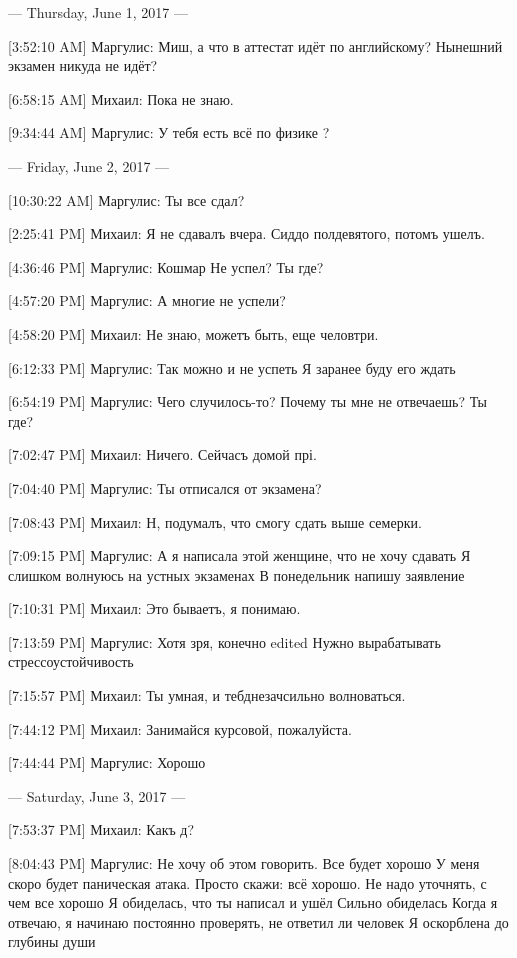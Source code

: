 \documentclass{article}
\newcommand{\yat}{{\fontencoding{X2}\selectfont\cyryat}} %
\begin{document}
\title{}
\author{}
\date{}
\maketitle

--- Thursday, June 1, 2017 ---

[3:52:10 AM] Маргулис:
Миш, а что в аттестат идёт по английскому?
 Нынешний экзамен никуда не идёт?

[6:58:15 AM] Михаил:
Пока не знаю.

[9:34:44 AM] Маргулис:
У тебя есть всё по физике
 ?

--- Friday, June 2, 2017 ---

[10:30:22 AM] Маргулис:
Ты все сдал?

[2:25:41 PM] Михаил:
Я не сдавалъ вчера. Сид до полдевятого, потомъ ушелъ.

[4:36:46 PM] Маргулис:
Кошмар
 Не успел?
 Ты где?

[4:57:20 PM] Маргулис:
А многие не успели?

[4:58:20 PM] Михаил:
Не знаю, можетъ быть, еще челов три.

[6:12:33 PM] Маргулис:
Так можно и не успеть
 Я заранее буду его ждать

[6:54:19 PM] Маргулис:
Чего случилось-то? Почему ты мне не отвечаешь?
 Ты где?

[7:02:47 PM] Михаил:
Ничего. Сейчасъ домой прі.

[7:04:40 PM] Маргулис:
Ты отписался от экзамена?

[7:08:43 PM] Михаил:
Н, подумалъ, что смогу сдать выше семерки.

[7:09:15 PM] Маргулис:
А я написала этой женщине, что не хочу сдавать
 Я слишком волнуюсь на устных экзаменах
 В понедельник напишу заявление

[7:10:31 PM] Михаил:
Это бываетъ, я понимаю.

[7:13:59 PM] Маргулис:
Хотя зря, конечно
edited 
Нужно вырабатывать стрессоустойчивость

[7:15:57 PM] Михаил:
Ты умная, и теб\yat д незач сильно волноваться.

[7:44:12 PM] Михаил:
Занимайся курсовой, пожалуйста.

[7:44:44 PM] Маргулис:
Хорошо

--- Saturday, June 3, 2017 ---

[7:53:37 PM] Михаил:
Какъ д?

[8:04:43 PM] Маргулис:
Не хочу об этом говорить.
 Все будет хорошо
 У меня скоро будет паническая атака. Просто скажи: всё хорошо. Не надо уточнять, с чем все хорошо
 Я обиделась, что ты написал и ушёл
 Сильно обиделась
 Когда я отвечаю, я начинаю постоянно проверять, не ответил ли человек
 Я оскорблена до глубины души
\end{document}
